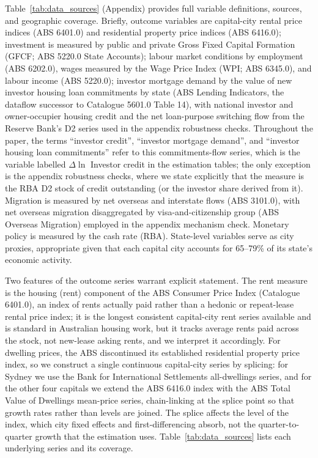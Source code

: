 \documentclass[preprint,11pt,authoryear]{elsarticle}
\begin{document}
Table~\ref{tab:data_sources} (Appendix) provides full variable
definitions, sources, and geographic coverage. Briefly, outcome variables
are capital-city rental price indices (ABS 6401.0) and residential
property price indices (ABS 6416.0); investment is measured by public and
private Gross Fixed Capital Formation (GFCF; ABS 5220.0 State Accounts);
labour market conditions by employment (ABS 6202.0), wages measured by
the Wage Price Index (WPI; ABS 6345.0), and labour income (ABS 5220.0);
investor mortgage demand by the value of new investor housing loan
commitments by state (ABS Lending Indicators, the dataflow successor to
Catalogue 5601.0 Table 14), with national investor and owner-occupier
housing credit and the net loan-purpose switching flow from the Reserve
Bank's D2 series used in the appendix robustness checks. Throughout the
paper, the terms ``investor credit'', ``investor mortgage demand'', and
``investor housing loan commitments'' refer to this commitments-flow
series, which is the variable labelled $\Delta\ln$ Investor credit in the
estimation tables; the only exception is the appendix robustness checks,
where we state explicitly that the measure is the RBA D2 stock of credit
outstanding (or the investor share derived from it). Migration is
measured by net overseas and interstate flows (ABS 3101.0), with net
overseas migration disaggregated by visa-and-citizenship group (ABS
Overseas Migration) employed in the appendix mechanism check. Monetary
policy is measured by the cash rate (RBA). State-level
variables serve as city proxies, appropriate given that each capital city
accounts for 65--79\% of its state's economic activity.

Two features of the outcome series warrant explicit statement. The rent
measure is the housing (rent) component of the ABS Consumer Price Index
(Catalogue 6401.0), an index of rents actually paid rather than a hedonic
or repeat-lease rental price index; it is the longest consistent
capital-city rent series available and is standard in Australian housing
work, but it tracks average rents paid across the stock, not new-lease
asking rents, and we interpret it accordingly. For dwelling prices, the
ABS discontinued its established residential property price index, so we
construct a single continuous capital-city series by splicing: for Sydney
we use the Bank for International Settlements all-dwellings series, and
for the other four capitals we extend the ABS 6416.0 index with the ABS
Total Value of Dwellings mean-price series, chain-linking at the splice
point so that growth rates rather than levels are joined. The splice
affects the level of the index, which city fixed effects and
first-differencing absorb, not the quarter-to-quarter growth that the
estimation uses. Table~\ref{tab:data_sources} lists each underlying
series and its coverage.
\end{document}

